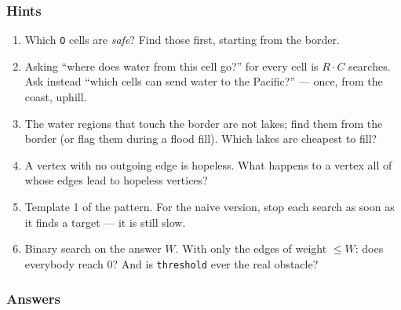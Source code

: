 \subsubsection*{Hints}
\begin{enumerate}[leftmargin=*, label=\textbf{E5.\arabic*}]
    \item Which \texttt{O} cells are \emph{safe}? Find those first, starting from the border.
    \item Asking ``where does water from this cell go?'' for every cell is $R \cdot C$ searches. Ask instead ``which cells can send water to the Pacific?'' --- once, from the coast, uphill.
    \item The water regions that touch the border are not lakes; find them from the border (or flag them during a flood fill). Which lakes are cheapest to fill?
    \item A vertex with no outgoing edge is hopeless. What happens to a vertex all of whose edges lead to hopeless vertices?
    \item Template 1 of the pattern. For the naive version, stop each search as soon as it finds a target --- it is still slow.
    \item Binary search on the answer $W$. With only the edges of weight $\le W$: does everybody reach 0? And is \texttt{threshold} ever the real obstacle?
\end{enumerate}

\subsubsection*{Answers}

